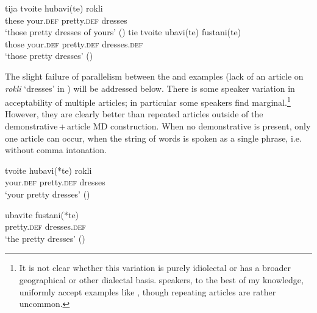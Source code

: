 \documentclass[output=paper]{langscibook}
\begin{document}
\ea \label{dresses2}
\ea \label{dresses2b}
\gll tija 	tvoite	hubavi(te) 	rokli\\
these 	your.\textsc{def}	pretty.\textsc{def}	dresses \\
\glt ‘those pretty dresses of yours’ \hfill()
\ex \label{dresses2m}
\gll tie 	tvoite ubavi(te)	fustani(te) \\
those your.\textsc{def}	pretty.\textsc{def} 	dresses.\textsc{def} \\
\glt‘those pretty dresses’ \hfill()
\z
\z

\noindent The slight failure of parallelism between the  and  examples (lack of an article on \textit{rokli} `dresses' in ) will be addressed below. There is some speaker variation in acceptability of multiple articles; in particular some  speakers find  marginal.\footnote{It is not clear whether this variation is purely idiolectal or has a broader geographical or other dialectal basis.  speakers, to the best of my knowledge, uniformly accept examples like , though repeating articles are rather uncommon.} However, they are clearly better than repeated articles outside of the demonstrative\,+\,article MD construction. When no demonstrative is present, only one article can occur, when the string of words is spoken as a single phrase, i.e. without comma intonation.



\ea \label{dresses3}
\ea \label{dresses3b}
\gll tvoite 	hubavi(*te) 	rokli\\
 	your.\textsc{def}	pretty.\textsc{def}	dresses \\
\glt ‘your pretty dresses’ \hfill()

\ex \label{dresses3m}
\gll ubavite	fustani(*te) \\
pretty.\textsc{def} 	dresses.\textsc{def} \\
\glt ‘the pretty dresses’ \hfill()
\z
\z
\end{document}
